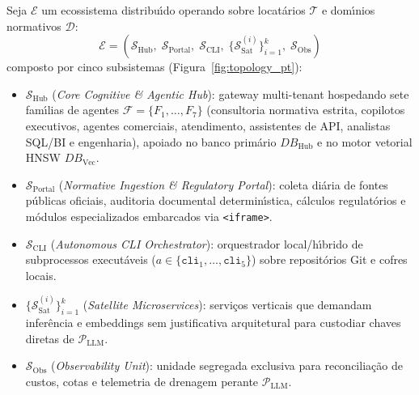 \documentclass[10pt,twocolumn]{article}
\begin{document}
Seja $\mathcal{E}$ um ecossistema distribu\'{\i}do operando sobre locat\'{a}rios $\mathcal{T}$ e dom\'{\i}nios normativos $\mathcal{D}$:
\begin{equation}
\mathcal{E} = \left(\mathcal{S}_{\mathrm{Hub}}, \; \mathcal{S}_{\mathrm{Portal}}, \; \mathcal{S}_{\mathrm{CLI}}, \; \{\mathcal{S}_{\mathrm{Sat}}^{(i)}\}_{i=1}^{k}, \; \mathcal{S}_{\mathrm{Obs}}\right)
\end{equation}
composto por cinco subsistemas (Figura~\ref{fig:topology_pt}):
\begin{itemize}[leftmargin=1.3em,itemsep=2pt,topsep=3pt]
  \item $\mathcal{S}_{\mathrm{Hub}}$ (\emph{Core Cognitive \& Agentic Hub}): gateway multi-tenant hospedando sete fam\'{\i}lias de agentes $\mathcal{F} = \{F_1, \dots, F_7\}$ (consultoria normativa estrita, copilotos executivos, agentes comerciais, atendimento, assistentes de API, analistas SQL/BI e engenharia), apoiado no banco prim\'{a}rio $DB_{\mathrm{Hub}}$ e no motor vetorial HNSW $DB_{\mathrm{Vec}}$.
  \item $\mathcal{S}_{\mathrm{Portal}}$ (\emph{Normative Ingestion \& Regulatory Portal}): coleta di\'{a}ria de fontes p\'{u}blicas oficiais, auditoria documental determin\'{\i}stica, c\'{a}lculos regulat\'{o}rios e m\'{o}dulos especializados embarcados via \texttt{<iframe>}.
  \item $\mathcal{S}_{\mathrm{CLI}}$ (\emph{Autonomous CLI Orchestrator}): orquestrador local/h\'{\i}brido de subprocessos execut\'{a}veis ($a \in \{\texttt{cli}_1, \dots, \texttt{cli}_5\}$) sobre reposit\'{o}rios Git e cofres locais.
  \item $\{\mathcal{S}_{\mathrm{Sat}}^{(i)}\}_{i=1}^{k}$ (\emph{Satellite Microservices}): servi\c{c}os verticais que demandam infer\^{e}ncia e embeddings sem justificativa arquitetural para custodiar chaves diretas de $\mathcal{P}_{\mathrm{LLM}}$.
  \item $\mathcal{S}_{\mathrm{Obs}}$ (\emph{Observability Unit}): unidade segregada exclusiva para reconcilia\c{c}\~{a}o de custos, cotas e telemetria de drenagem perante $\mathcal{P}_{\mathrm{LLM}}$.
\end{itemize}
\end{document}
